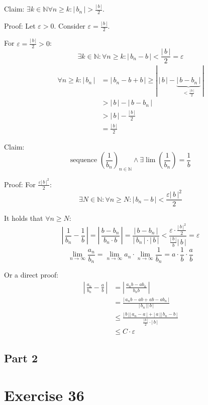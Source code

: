\documentclass[a4paper]{article}
\theoremstyle{definition}
\newcommand\card[1]{\left|\,#1\,\right|}
\begin{document}
Claim: $\exists k \in \mathbb N \forall n \geq k: \card{b_n} > \frac{\card{b}}{2}$.

Proof: Let $\varepsilon > 0$. Consider $\varepsilon = \frac{\card{b}}{2}$.

For $\varepsilon = \frac{\card{b}}{2} > 0$:
\[ \exists k \in \mathbb N: \forall n \geq k: \card{b_n - b} < \frac{\card{b}}{2} = \varepsilon \]
\begin{align*}
  \forall n \geq k: \card{b_n}
      &= \card{b_n - b + b} \geq \card{\card{b} - \underbrace{\card{b - b_n}}_{<\frac{\card{b}}{2}}} \\
      &> \card{b} - \card{b - b_n} \\
      &> \card{b} - \frac{\card{b}}{2} \\
      &= \frac{\card{b}}{2}
\end{align*}

Claim:
\[ \text{sequence } \left(\frac{1}{b_n}\right)_{n \in \mathbb N} \land \exists \lim\left(\frac{1}{b_n}\right) = \frac1b \]

Proof:
For $\frac{\varepsilon \card{b}^2}{2}:$
\[ \exists N \in \mathbb N: \forall n \geq N: \card{b_n - b} < \frac{\varepsilon \card{b}^2}{2} \]

It holds that $\forall n \geq N:$
\[ \card{\frac1{b_n} - \frac1b} = \card{\frac{b - b_n}{b_n \cdot b}} = \frac{\card{b - b_n}}{\card{b_n} \cdot \card{b}} < \frac{\varepsilon \cdot \frac{\card{b}^2}{2}}{\frac{\card{b}}{b} \card{b}} = \varepsilon \]
\[ \lim_{n\to\infty} \frac{a_n}{b_n} = \lim_{n\to\infty} a_n \cdot \lim_{n\to\infty} \frac{1}{b_n} = a \cdot \frac1b \cdot \frac{a}{b} \]

Or a direct proof:
\begin{align*}
  \card{\frac{a_n}{b_n} - \frac{a}{b}}
    &= \card{\frac{a_n b - ab_n}{b_n b}} \\
    &= \frac{\card{a_n b - a b + a b - a b_n}}{\card{b_n} \card{b}} \\
    &\leq \frac{\card{b} \card{a_n - a} + \card{a} \card{b_n - b}}{\frac{\card{b}}{2} \cdot \card{b}} \\
    &\leq C \cdot \varepsilon
\end{align*}

\subsection{Part 2}


\section{Exercise 36}
\end{document}
